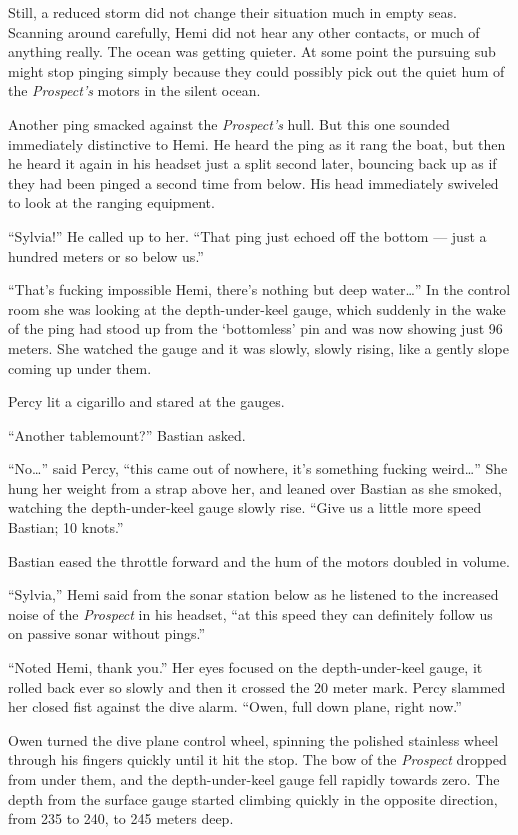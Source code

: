 \documentclass[]{scrbook}
\begin{document}
Still, a reduced storm did not change their situation much in empty
seas. Scanning around carefully, Hemi did not hear any other contacts,
or much of anything really. The ocean was getting quieter. At some point
the pursuing sub might stop pinging simply because they could possibly
pick out the quiet hum of the \emph{Prospect's} motors in the silent
ocean.

Another ping smacked against the \emph{Prospect's} hull. But this one
sounded immediately distinctive to Hemi. He heard the ping as it rang
the boat, but then he heard it again in his headset just a split second
later, bouncing back up as if they had been pinged a second time from
below. His head immediately swiveled to look at the ranging equipment.

``Sylvia!'' He called up to her. ``That ping just echoed off the bottom
--- just a hundred meters or so below us.''

``That's fucking impossible Hemi, there's nothing but deep
water\ldots{}'' In the control room she was looking at the
depth-under-keel gauge, which suddenly in the wake of the ping had stood
up from the `bottomless' pin and was now showing just 96 meters. She
watched the gauge and it was slowly, slowly rising, like a gently slope
coming up under them.

Percy lit a cigarillo and stared at the gauges.

``Another tablemount?'' Bastian asked.

``No\ldots{}'' said Percy, ``this came out of nowhere, it's something
fucking weird\ldots{}'' She hung her weight from a strap above her, and
leaned over Bastian as she smoked, watching the depth-under-keel gauge
slowly rise. ``Give us a little more speed Bastian; 10 knots.''

Bastian eased the throttle forward and the hum of the motors doubled in
volume.

``Sylvia,'' Hemi said from the sonar station below as he listened to the
increased noise of the \emph{Prospect} in his headset, ``at this speed
they can definitely follow us on passive sonar without pings.''

``Noted Hemi, thank you.'' Her eyes focused on the depth-under-keel
gauge, it rolled back ever so slowly and then it crossed the 20 meter
mark. Percy slammed her closed fist against the dive alarm. ``Owen, full
down plane, right now.''

Owen turned the dive plane control wheel, spinning the polished
stainless wheel through his fingers quickly until it hit the stop. The
bow of the \emph{Prospect} dropped from under them, and the
depth-under-keel gauge fell rapidly towards zero. The depth from the
surface gauge started climbing quickly in the opposite direction, from
235 to 240, to 245 meters deep.
\end{document}
